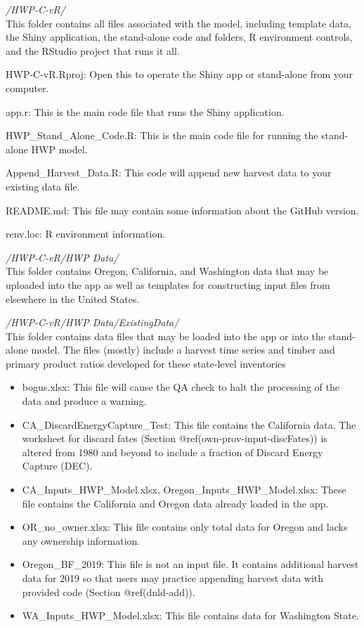 \documentclass[
  openany]{book}
\begin{document}
\emph{/HWP-C-vR/}\\
This folder contains all files associated with the model, including
template data, the Shiny application, the stand-alone code and folders,
R environment controls, and the RStudio project that runs it all.

HWP-C-vR.Rproj: Open this to operate the Shiny app or stand-alone from
your computer.

app.r: This is the main code file that runs the Shiny application.

HWP\_Stand\_Alone\_Code.R: This is the main code file for running the
stand-alone HWP model.

Append\_Harvest\_Data.R: This code will append new harvest data to your
existing data file.

README.md: This file may contain some information about the GitHub
version.

renv.loc: R environment information.

\emph{/HWP-C-vR/HWP Data/}\\
This folder contains Oregon, California, and Washington data that may be
uploaded into the app as well as templates for constructing input files
from elsewhere in the United States.

\emph{/HWP-C-vR/HWP Data/ExistingData/}\\
This folder contains data files that may be loaded into the app or into
the stand-alone model. The files (mostly) include a harvest time series
and timber and primary product ratios developed for these state-level
inventories

\begin{itemize}
\item
  bogus.xlsx: This file will cause the QA check to halt the processing
  of the data and produce a warning.
\item
  CA\_DiscardEnergyCapture\_Test: This file contains the California
  data. The worksheet for discard fates (Section
  @ref(own-prov-input-discFates)) is altered from 1980 and beyond to
  include a fraction of Discard Energy Capture (DEC).
\item
  CA\_Inputs\_HWP\_Model.xlsx, Oregon\_Inputs\_HWP\_Model.xlsx: These
  file contains the California and Oregon data already loaded in the
  app.
\item
  OR\_no\_owner.xlsx: This file contains only total data for Oregon and
  lacks any ownership information.
\item
  Oregon\_BF\_2019: This file is not an input file. It contains
  additional harvest data for 2019 so that users may practice appending
  harvest data with provided code (Section @ref(dnld-add)).
\item
  WA\_Inputs\_HWP\_Model.xlsx: This file contains data for Washington
  State.
\end{itemize}
\end{document}

